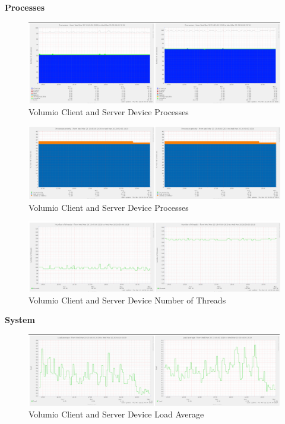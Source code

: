 \documentclass[11pt,a4paper,headinclude=false,footinclude=false]{scrreprt}
\begin{document}
\textbf{Processes}

\begin{figure}[H]
\includegraphics{ResultsAndAnalysis/VolumioServerTestImages/020VolumioProcesses.png}
\centering
\caption{Volumio Client and Server Device Processes}
\label{VolumioProcesses}
\end{figure}

\begin{figure}[H]
\includegraphics{ResultsAndAnalysis/VolumioServerTestImages/021VolumioProcessPriority.png}
\centering
\caption{Volumio Client and Server Device Processes}
\label{VolumioProcessPriority}
\end{figure}

\begin{figure}[H]
\includegraphics{ResultsAndAnalysis/VolumioServerTestImages/019VolumioNoOfThreads.png}
\centering
\caption{Volumio Client and Server Device Number of Threads}
\label{VolumioNumThreads}
\end{figure}

\textbf{System}

\begin{figure}[H]
\includegraphics{ResultsAndAnalysis/VolumioServerTestImages/016VolumioLoadAverage.png}
\centering
\caption{Volumio Client and Server Device Load Average}
\label{VolumioLoadAvg}
\end{figure}
\end{document}
